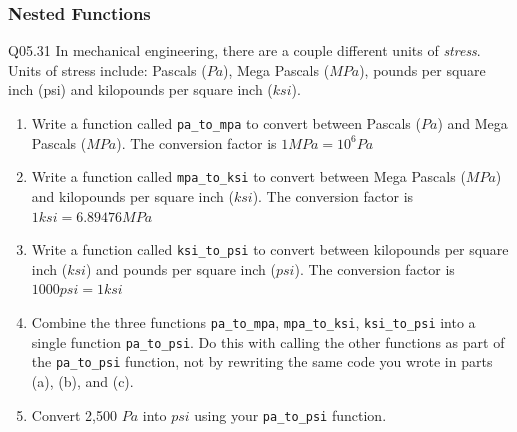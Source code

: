 \documentclass{book}
\newenvironment{problems}{}{}  %
\begin{document}
    
        \begin{problems}
        \subsubsection{Nested Functions}\label{nested-functions}

Q05.31 In mechanical engineering, there are a couple different units of
\emph{stress}. Units of stress include: Pascals (\(Pa\)), Mega Pascals
(\(MPa\)), pounds per square inch (psi) and kilopounds per square inch
(\(ksi\)).

\begin{enumerate}
\def\labelenumi{(\alph{enumi})}
\item
  Write a function called \lstinline!pa_to_mpa! to convert between
  Pascals (\(Pa\)) and Mega Pascals (\(MPa\)). The conversion factor is
  \(1 MPa = 10^6 Pa\)
\item
  Write a function called \lstinline!mpa_to_ksi! to convert between Mega
  Pascals (\(MPa\)) and kilopounds per square inch (\(ksi\)). The
  conversion factor is \(1 ksi = 6.89476 MPa\)
\item
  Write a function called \lstinline!ksi_to_psi! to convert between
  kilopounds per square inch (\(ksi\)) and pounds per square inch
  (\(psi\)). The conversion factor is \(1000 psi = 1 ksi\)
\item
  Combine the three functions \lstinline!pa_to_mpa!,
  \lstinline!mpa_to_ksi!, \lstinline!ksi_to_psi! into a single function
  \lstinline!pa_to_psi!. Do this with calling the other functions as
  part of the \lstinline!pa_to_psi! function, not by rewriting the same
  code you wrote in parts (a), (b), and (c).
\item
  Convert 2,500 \(Pa\) into \(psi\) using your \lstinline!pa_to_psi!
  function.
\end{enumerate}
        \end{problems}

    
\end{document}
